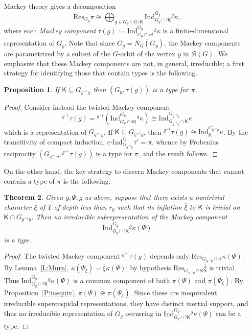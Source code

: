 \documentclass[12pt]{amsart}
\newcommand{\Res}{\mathrm{Res}} %
\newcommand{\Ind}{\mathrm{Ind}} %
\newcommand{\cind}{\textrm{c-}\mathrm{Ind}} %
\newcommand{\buil}{\mathcal{B}}
\newcommand{\KT}{\mathsf{K}}
\theoremstyle{plain}
\newtheorem{theorem}{Theorem}[section]
\newtheorem{proposition}[theorem]{Proposition}
\theoremstyle{definition}
\theoremstyle{remark}
\numberwithin{equation}{section}
\numberwithin{figure}{section}
\begin{document}
Mackey theory gives a decomposition
$$
\Res_{G_y}\pi  \cong \bigoplus_{g \in G_y\backslash G/\KT}\Ind_{G_y\cap {}^g\KT}^{G_y} {}^g\kappa,
$$
where each \emph{Mackey component} $\tau(g):=\Ind_{G_y\cap {}^g\KT}^{G_y} {}^g\kappa$ is a finite-dimensional representation of $G_y$.  Note that since $G_y=N_G(G_y)$, the Mackey components are parametrized by a subset of the $G$-orbit of the vertex $y$ in $\buil(G)$. 
We emphasize that these Mackey components are not, in general, irreducible; a first strategy for identifying those that contain types is the following.

\begin{proposition}\label{P:type}
If $\KT \subseteq G_{g^{-1}y}$ then $(G_y,\tau(g))$ is a type for $\pi$.
\end{proposition}

\begin{proof}
Consider instead the twisted Mackey component
$$
 {}^{g^{-1}}\tau(g) = {}^{g^{-1}}(\Ind_{G_y\cap {}^g\KT}^{G_y} {}^g\kappa) \cong \Ind_{G_{g^{-1}y}\cap \KT}^{G_{g^{-1}y}} \kappa
$$
which is a representation of $G_{g^{-1}y}$.  If $\KT\subseteq G_{g^{-1}y}$, then ${}^{g^{-1}}\tau(g) \cong \Ind_{\KT}^{G_{g^{-1}y}}\kappa$.  By the transitivity of compact induction, $\cind_{G_{g^{-1}y}}^G\tau' = \pi$, whence by Frobenius reciprocity $(G_{g^{-1}y},{}^{g^{-1}}\tau(g))$ is a type for $\pi$, and the result follows.
\end{proof}


On the other hand, the key strategy to discern Mackey components that cannot contain a type of $\pi$ is the following.

\begin{theorem} \label{T:inequiv}
Given $y, \Psi, g$ as above, suppose that there exists a nontrivial character $\xi$ of $T$ of depth less than $r_0$ such that its inflation $\overline{\xi}$ to $\KT$ is trivial on $\KT \cap G_{g^{-1}y}$.   
Then no irreducible subrepresentation of the Mackey component
$$
\Ind_{G_y \cap {}^g\KT}^{G_y} {}^g\kappa(\Psi)
$$
is a type.
\end{theorem}

\begin{proof}
The twisted Mackey component ${}^{g^{-1}}\tau(g)$ depends only $\Res_{G_{g^{-1}y}\cap \KT}\kappa(\Psi)$.  By Lemma~\ref{L:Murn}, $\kappa(\Psi_\xi)=\overline{\xi}\kappa(\Psi)$; by hypothesis 
$\Res_{G_{g^{-1}y}\cap\KT}\overline{\xi}$ is trivial.  
Thus 
$\Ind_{G_y \cap {}^g\KT}^{G_y} {}^g\kappa(\Psi)$ is a common component of both $\pi(\Psi)$ and $\pi(\Psi_\xi)$.  By Proposition~\ref{P:inequiv}, $\pi(\Psi)\not\cong\pi(\Psi_\xi)$.  Since these are inequivalent irreducible supercuspidal representations, they have distinct inertial support, and thus no irreducible representation of $G_y$ occurring in $\Ind_{G_y \cap {}^g\KT}^{G_y} {}^g\kappa(\Psi)$ can be a type.
\end{proof}
\end{document}
